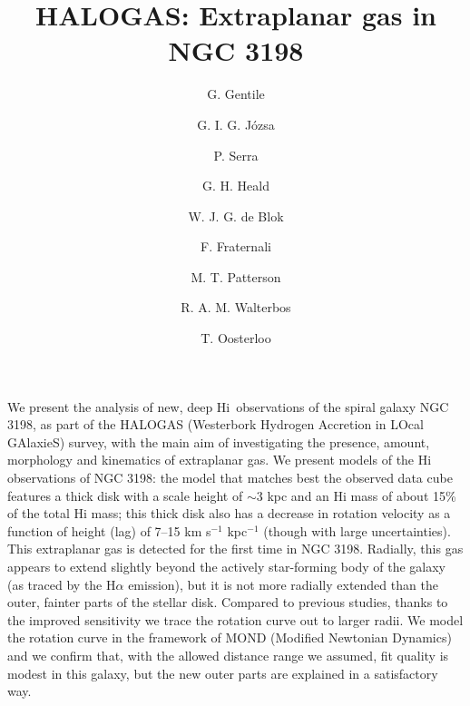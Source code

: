 \documentclass[traditabstract]{aa}
\begin{document}
\title{HALOGAS: Extraplanar gas in NGC 3198}

\author{G. Gentile \and G. I. G. J\'ozsa \and
  P. Serra \and G. H. Heald \and W. J. G. de
  Blok \and F. Fraternali \and
  M. T. Patterson \and R. A. M. Walterbos \and
  T. Oosterloo }  

    


\abstract
{We present the analysis of new, deep H{\sc i}\ observations of the spiral
  galaxy NGC 3198, as part of the HALOGAS (Westerbork Hydrogen
  Accretion in LOcal GAlaxieS) survey, with the main aim of
  investigating the presence, amount, morphology and kinematics of
  extraplanar gas. We present models of the H{\sc i} observations of NGC
  3198: the model that matches best the observed data cube features a
  thick disk with a scale height of $\sim$3 kpc and an H{\sc i} mass of about
  15\% of the total H{\sc i} mass; this thick disk also has a decrease in
 rotation velocity as a function of height (lag) of 7--15 km s$^{-1}$
 kpc$^{-1}$ (though with large uncertainties). This extraplanar gas is
 detected for the first time in NGC 3198. Radially, this
 gas appears to extend slightly beyond the actively
 star-forming body of the galaxy (as traced by the H$\alpha$ emission),
 but it is not more radially extended than the outer, fainter
 parts of the stellar disk. Compared to previous studies, thanks
 to the improved sensitivity we trace the rotation curve out to
 larger radii. We model the rotation curve in the framework of
 MOND (Modified Newtonian Dynamics) and we confirm that, with the
 allowed distance range we assumed, fit quality is modest in this
 galaxy, but the new outer parts are explained in a satisfactory
 way. 
}
\end{document}
